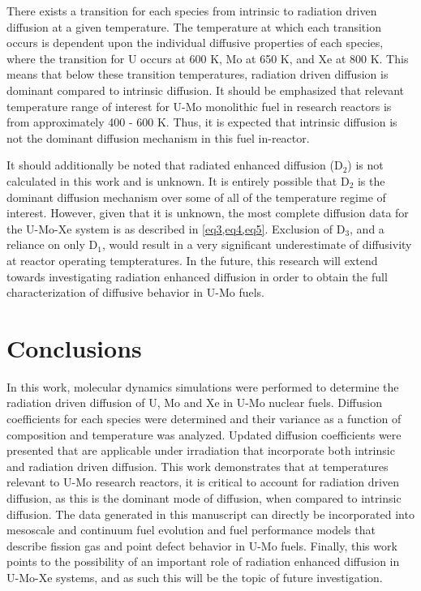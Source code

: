 \documentclass[review]{elsarticle}
\begin{document}
There exists a transition for each species from intrinsic to radiation driven diffusion at a given temperature. The temperature at which each transition occurs is dependent upon the individual diffusive properties of each species, where the transition for U occurs at 600 K, Mo at 650 K, and Xe at 800 K. This means that below these transition temperatures, radiation driven diffusion is dominant compared to intrinsic diffusion. It should be emphasized that relevant temperature range of interest for U-Mo monolithic fuel in research reactors is from approximately 400 - 600 K. Thus, it is expected that intrinsic diffusion is not the dominant diffusion mechanism in this fuel in-reactor.

It should additionally be noted that radiated enhanced diffusion (D$_2$) is not calculated in this work and is unknown. It is entirely possible that D$_2$ is the dominant diffusion mechanism over some of all of the temperature regime of interest. However, given that it is unknown, the most complete diffusion data for the U-Mo-Xe system is as described in \cref{eq3,eq4,eq5}. Exclusion of D$_3$, and a reliance on only D$_1$, would result in a very significant underestimate of diffusivity at reactor operating tempteratures. In the future, this research will extend towards investigating radiation enhanced diffusion in order to obtain the full characterization of diffusive behavior in U-Mo fuels. 

\FloatBarrier

\section{Conclusions}

In this work, molecular dynamics simulations were performed to determine the radiation driven diffusion of U, Mo and Xe in U-Mo nuclear fuels. Diffusion coefficients for each species were determined and their variance as a function of composition and temperature was analyzed. Updated diffusion coefficients were presented that are applicable under irradiation that incorporate both intrinsic and radiation driven diffusion. This work demonstrates that at temperatures relevant to U-Mo research reactors, it is critical to account for radiation driven diffusion, as this is the dominant mode of diffusion, when compared to intrinsic diffusion. The data generated in this manuscript can directly be incorporated into mesoscale and continuum fuel evolution and fuel performance models that describe fission gas and point defect behavior in U-Mo fuels. Finally, this work points to the possibility of an important role of radiation enhanced diffusion in U-Mo-Xe systems, and as such this will be the topic of future investigation. 
\end{document}
